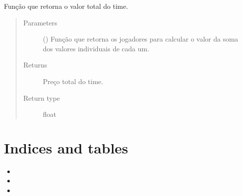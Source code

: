 \documentclass[letterpaper,10pt,brazil]{sphinxmanual}
\begin{document}

\begin{fulllineitems}
\label{\detokenize{solucao_fifa:solucao_fifa.valor_total_time}}
Função que retorna o valor total do time.
\begin{quote}\begin{description}
\item[{Parameters}] \leavevmode
{} () \textendash{} Função que retorna os jogadores para calcular o valor da soma dos valores individuais de cada um.

\item[{Returns}] \leavevmode
Preço total do time.

\item[{Return type}] \leavevmode
float

\end{description}\end{quote}

\end{fulllineitems}



\chapter{Indices and tables}
\label{\detokenize{index:indices-and-tables}}\begin{itemize}
\item {} 

\item {} 

\item {} 

\end{itemize}


\renewcommand{\indexname}{Python Module Index}
\begin{sphinxtheindex}
\let\bigletter\sphinxstyleindexlettergroup
\bigletter{c}
\item\relax{}
\item\relax{}
\indexspace
\bigletter{f}
\item\relax{}
\indexspace
\bigletter{s}
\item\relax{}
\end{sphinxtheindex}

\renewcommand{\indexname}{Index}
\printindex
\end{document}
